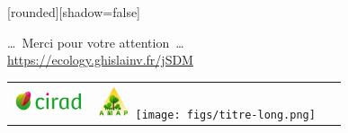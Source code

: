 
{
  [rounded][shadow=false]
  
  \begin{frame}
      \vspace{0.5cm}
    \begin{block}{}
      \begin{center}
        \ldots~Merci pour votre attention~\ldots \\
        \url{https://ecology.ghislainv.fr/jSDM}
      \end{center}
    \end{block}
    \vspace{6.2cm}

    \begin{center}     
    \begin{tabular}{C{2cm}C{2cm}C{5cm}}
        \includegraphics[height=0.7cm]{figs/Logo-Cirad.png} &
        \includegraphics[height=1cm, width=1cm]{figs/logo-AMAP.png} 
        \texttt{[image: figs/titre-long.png]} &
        ~
      \end{tabular}
    \end{center}

  \end{frame}
}